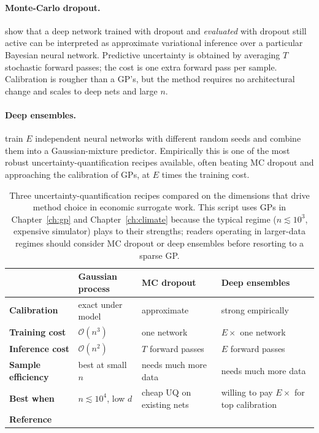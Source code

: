 \documentclass[11pt,a4paper]{report}
\begin{document}
\paragraph{Monte-Carlo dropout.}  \citet{gal2016dropout} show that a deep network trained with dropout and \emph{evaluated} with dropout still active can be interpreted as approximate variational inference over a particular Bayesian neural network.  Predictive uncertainty is obtained by averaging $T$ stochastic forward passes; the cost is one extra forward pass per sample.  Calibration is rougher than a GP's, but the method requires no architectural change and scales to deep nets and large $n$.

\paragraph{Deep ensembles.}  \citet{lakshminarayanan2017simple} train $E$ independent neural networks with different random seeds and combine them into a Gaussian-mixture predictor.  Empirically this is one of the most robust uncertainty-quantification recipes available, often beating MC dropout and approaching the calibration of GPs, at $E$ times the training cost.

\begin{table}[ht]
\centering
\small
\setlength{\tabcolsep}{4pt}
\begin{tabular}{@{} >{\bfseries}p{3.0cm} p{3.6cm} p{3.6cm} p{3.6cm} @{}}
\toprule
 & \textbf{Gaussian process} & \textbf{MC dropout} & \textbf{Deep ensembles} \\
\midrule
Calibration            & exact under model               & approximate                       & strong empirically                  \\
Training cost          & $\mathcal{O}(n^3)$              & one network                       & $E\times$ one network               \\
Inference cost         & $\mathcal{O}(n^2)$              & $T$ forward passes                & $E$ forward passes                  \\
Sample efficiency      & best at small $n$               & needs much more data              & needs much more data                \\
Best when              & $n \lesssim 10^4$, low $d$      & cheap UQ on existing nets         & willing to pay $E\times$ for top calibration \\
Reference              & \citet{Rasmussen:2005:GPM:1162254} & \citet{gal2016dropout}        & \citet{lakshminarayanan2017simple}  \\
\bottomrule
\end{tabular}
\caption{Three uncertainty-quantification recipes compared on the dimensions that drive method choice in economic surrogate work.  This script uses GPs in Chapter~\ref{ch:gp} and Chapter~\ref{ch:climate} because the typical regime ($n \lesssim 10^3$, expensive simulator) plays to their strengths; readers operating in larger-data regimes should consider MC dropout or deep ensembles before resorting to a sparse GP.}
\label{tab:gp_vs_bnn}
\end{table}
\end{document}
